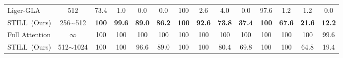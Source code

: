 \begin{table}[ht]
{\begin{tabular}{l|c|cccc|cccc|cccc}
            Liger-GLA~\citep{liger} & 512 & 73.4 & 1.0 & 0.0 & 0.0 & 100 & 2.6 & 4.0 & 0.0 & 97.6 & 1.2 & 1.2 & 0.0 \\
            \rowcolor[HTML]{E2ECF9}
            STILL~(Ours) & 256$\sim$512 & \textbf{100} & \textbf{99.6} & \textbf{89.0} & \textbf{86.2} & \textbf{100} & \textbf{92.6} & \textbf{73.8} & \textbf{37.4} & \textbf{100} & \textbf{67.6} & \textbf{21.6} & \textbf{12.2} \\
            \midrule
            Full Attention & $\infty$ & 100 & 100 & 100 & 100 & 100 & 100 & 100 & 100 & 100 & 100 & 100 & 99.6\\
            \rowcolor[HTML]{E2ECF9}
            STILL~(Ours) & 512$\sim$1024 & 100 & 100 & 96.6 & 89.0 & 100 & 100 & 80.4 & 69.8 & 100 & 100 & 64.8 & 19.4 \\
            \bottomrule
        \end{tabular}
    }
\end{table}

